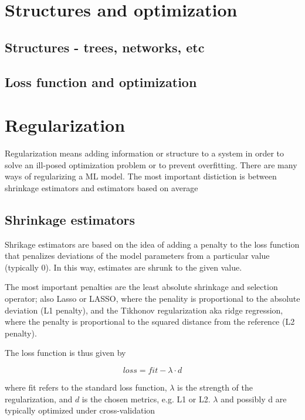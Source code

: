 \documentclass[a4paper,twoside]{tufte-book}\usepackage[]{graphicx}\usepackage[]{color}
\begin{document}


\section{Structures and optimization}

\subsection{Structures - trees, networks, etc}


\subsection{Loss function and optimization}


\section{Regularization}

Regularization means adding information or structure to a system in order to solve an ill-posed optimization problem or to prevent overfitting. There are many ways of regularizing a ML model. The most important distiction is between shrinkage estimators and estimators based on average 

\subsection{Shrinkage estimators} 

Shrikage estimators are based on the idea of adding a penalty to the loss function that penalizes deviations of the model parameters from a particular value (typically 0). In this way, estimates are shrunk to the given value.

The most important penalties are the least absolute shrinkage and selection operator; also Lasso or LASSO, where the penality is proportional to the absolute deviation (L1 penalty), and the Tikhonov regularization aka ridge regression, where the penalty is proportional to the squared distance from the reference (L2 penalty). 

The loss function is thus given by 

\begin{equation}
loss = fit - \lambda \cdot d
\end{equation}

where fit refers to the standard loss function, $\lambda$ is the strength of the regularization, and $d$ is the chosen metrics, e.g. L1 or L2. $\lambda$ and possibly d are typically optimized under cross-validation
\end{document}
